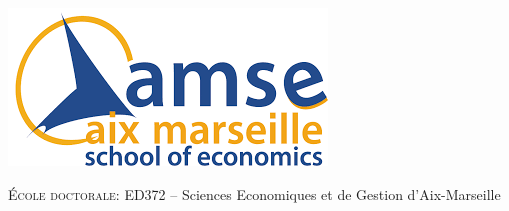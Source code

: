 {\begin{minipage}{0.4\textwidth}
\vspace{0.3cm}
\includegraphics[scale=.30]{../Divers/images/logo_amse.png}
\vspace{0.1cm}
\end{minipage}
}


\vspace{0.5cm}

\begin{center}
\normalsize \textsc{École doctorale:} ED372 --  Sciences Economiques et de Gestion d'Aix-Marseille 
\end{center}

